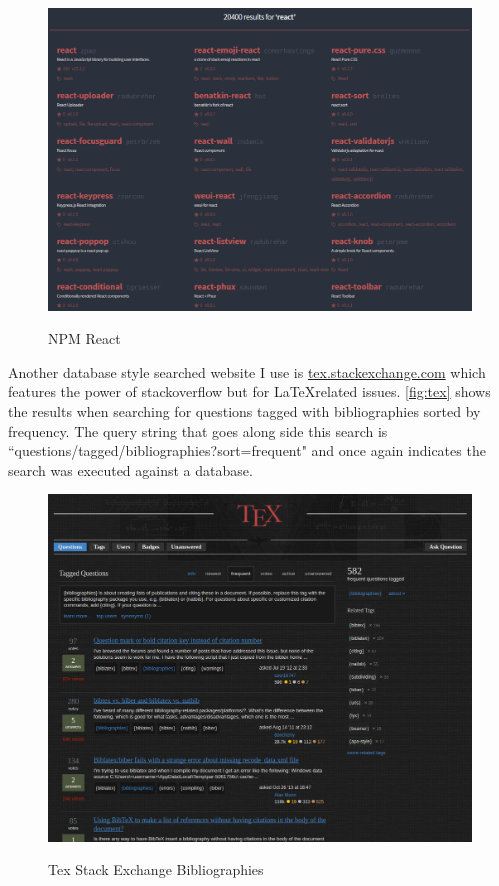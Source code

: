 \documentclass[11pt]{article}
\begin{document}
\begin{figure}[h]
	\centering
		{\includegraphics[scale=0.5]{searchStyleNPM.png}} 
	\caption{NPM React} \label{fig:npm}
\end{figure}
\newpage
\noindent
Another database style searched website I use is \hyperref[http://tex.stackexchange.com]{tex.stackexchange.com} which features the power of stackoverflow but for \LaTeX related issues. \autoref{fig:tex} shows the results when searching for questions tagged with bibliographies sorted by frequency. The query string that goes along side this search is
``questions/tagged/bibliographies?sort=frequent" and once again indicates the search was executed against a database.
\begin{figure}[h]
	\centering
		{\includegraphics[scale=0.5]{searchStyleTex.png}} 
	\caption{Tex Stack Exchange Bibliographies} \label{fig:tex}
\end{figure}
\end{document}
